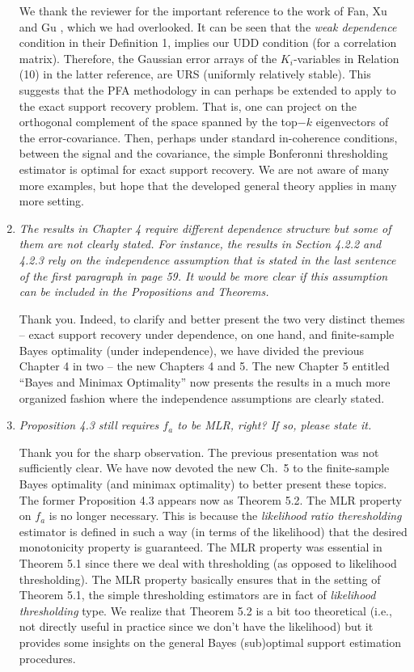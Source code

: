 \documentclass[11pt]{article}
\begin{document}
\begin{enumerate}
   We thank the reviewer for the important reference to the work of Fan, Xu and Gu \cite{fan:xu:gu:2012}, which we had overlooked.  
   It can be seen that the {\em weak dependence} condition in their Definition 1, implies our UDD condition (for a correlation matrix).  
   Therefore, the Gaussian error arrays of the $K_i$-variables in Relation (10) in the latter reference, are URS (uniformly relatively stable).  
   This suggests that the PFA methodology in \cite{fan:xu:gu:2012} can perhaps be extended to apply to the exact support recovery problem.  
   That is, one can project on the orthogonal complement of the space spanned by the top$-k$ eigenvectors of the error-covariance.  Then, perhaps 
   under standard in-coherence conditions, between the  signal and the covariance, the simple Bonferonni thresholding estimator is optimal for exact 
   support recovery.  We are not aware of many more examples, but hope that the developed general theory applies in many more setting.  
   
   
   \item  {\em The results in Chapter 4 require different dependence structure but some of them are not clearly stated. For instance, the results in Section 4.2.2 and 4.2.3 rely on the independence assumption that is stated in the last sentence of the first paragraph in page 59. It would be more clear if this assumption can be included in the Propositions and Theorems.}
   
   Thank you.  Indeed, to clarify and better present the two very distinct themes -- exact support recovery under dependence, on one hand, and 
   finite-sample Bayes optimality (under independence), we have divided the previous Chapter 4 in two -- the new Chapters 4 and 5. The new
   Chapter 5 entitled ``Bayes and Minimax Optimality'' now presents the results in a much more organized fashion where the independence 
   assumptions are clearly stated. 
    
   \item {\em Proposition 4.3 still requires $f_a$ to be MLR, right? If so, please state it.}
   
   Thank you for the sharp observation.  The previous presentation was not sufficiently clear.  We have now devoted the new Ch.\ 5 to the
   finite-sample Bayes optimality (and minimax optimality) to better present these topics.  
   The former Proposition 4.3 appears now as Theorem 5.2.  The MLR property on $f_a$
   is no longer necessary.  This is because the {\em likelihood ratio theresholding} estimator is defined in such a way (in terms of the likelihood) that
   the desired monotonicity property is guaranteed.  The MLR property was essential in Theorem 5.1 since there we deal with thresholding (as opposed to
   likelihood thresholding). The MLR property basically ensures that in the setting of Theorem 5.1, the simple thresholding estimators are in fact of
   {\em likelihood thresholding} type.  We realize that Theorem 5.2 is a bit too theoretical (i.e., not directly useful in practice since we don't have the 
   likelihood) but it provides some insights on
   the general Bayes (sub)optimal support estimation procedures.
   

\end{enumerate}
\end{document}
